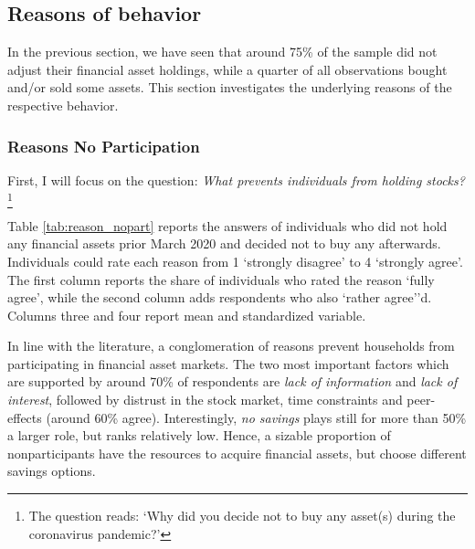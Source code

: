\documentclass[ProjectABM]{subfiles}
\begin{document}




\subsection{Reasons of behavior}
In the previous section, we have seen that around 75\% of the sample did not adjust their financial asset holdings, while a quarter of all observations bought and/or sold some assets. This section investigates the underlying reasons of the respective behavior.

\subsubsection{Reasons No Participation}\label{sec:reason_nopart}
First, I will focus on the question: \textit{What prevents individuals from holding stocks?}\footnote{The question reads: `Why did you decide not to buy any asset(s) during the coronavirus pandemic?'} 

Table \ref{tab:reason_nopart} reports the answers of individuals who did not hold any financial assets prior March 2020 and decided not to buy any afterwards. Individuals could rate each reason from 1 `strongly disagree' to 4 `strongly agree'. The first column reports the share of individuals who rated the reason `fully agree', while the second column adds respondents who also `rather agree''d. Columns three and four report mean and standardized variable. %

In line with the literature, a conglomeration of reasons prevent households from participating in financial asset markets. The two most important factors which are supported by around 70\% of respondents are \textit{lack of information} and \textit{lack of interest}, followed by distrust in the stock market, time constraints and peer-effects (around 60\% agree). Interestingly, \textit{no savings} plays still for more than 50\% a larger role, but ranks relatively low. Hence, a sizable proportion of nonparticipants have the resources to acquire financial assets, but choose different savings options. %
\end{document}
